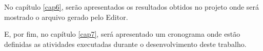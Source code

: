 No capítulo \ref{cap6}, serão apresentados os resultados obtidos no projeto onde será mostrado o arquivo gerado pelo Editor.

E, por fim, no capítulo \ref{cap7}, será apresentado um cronograma onde estão definidas as atividades executadas durante o desenvolvimento deste trabalho.

